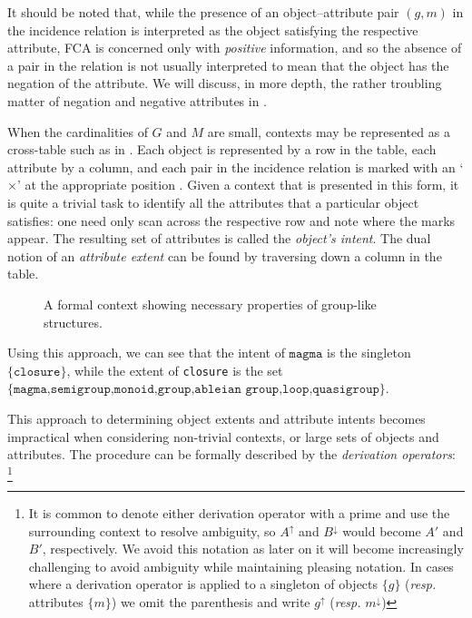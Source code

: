 It should be noted that, while the presence of an object--attribute pair $(g,m)$
in the incidence relation is interpreted as the object satisfying the respective
attribute, FCA is concerned only with \textit{positive} information, and so the absence
of a pair in the relation is not usually interpreted to mean that the object has
the negation of the attribute. We will discuss, in more depth, the rather
troubling matter of negation and negative attributes in
.

When the cardinalities of $G$ and $M$ are small, contexts may be represented as a
cross-table such as in . Each object is represented by a
row in the table, each attribute by a column, and each pair in the incidence
relation is marked with an `$\times$' at the appropriate position
\cite[pp. 17]{ganter1999formal}. Given a context that is presented in this form,
it is quite a trivial task to identify all the attributes that a particular
object satisfies: one need only scan across the respective row and note where the
marks appear. The resulting set of attributes is called the \textit{object's
intent}. The dual notion of an \textit{attribute extent} can be found by traversing
down a column in the table.

\begin{figure}[H]
  \centering
  \small
  \begin{cxt}
    \label{cxt:grouplikes}  
      
      
      
      
     
  \end{cxt}
  \caption{A formal context showing necessary properties of group-like
  structures.}
  \label{context:formal-context-group-structures}
\end{figure}

Using this approach, we can see that the intent of $\texttt{magma}$ is the singleton
$\{\texttt{closure}\}$, while the extent of \texttt{closure} is the set $\{\texttt
{magma,semigroup,monoid,group,ableian group,loop,quasigroup}\}$.

This approach to determining object extents and attribute intents becomes impractical
when considering non-trivial contexts, or large sets of objects and attributes. The
procedure can be formally described by the \textit{derivation operators}: \footnote{It
is common to denote either derivation operator with a prime and use the
surrounding context to resolve ambiguity, so $A^{\uparrow}$ and $B^{\downarrow}$
would become $A'$ and $B'$, respectively. We avoid this notation as later on it will
become increasingly challenging to avoid ambiguity while maintaining pleasing notation.
In cases where a derivation operator is applied to a singleton of objects
$\{g\}$ (\textit{resp.} attributes $\{m\}$) we omit the parenthesis and write $g^{\uparrow}$
(\textit{resp.} $m^{\downarrow}$)}

